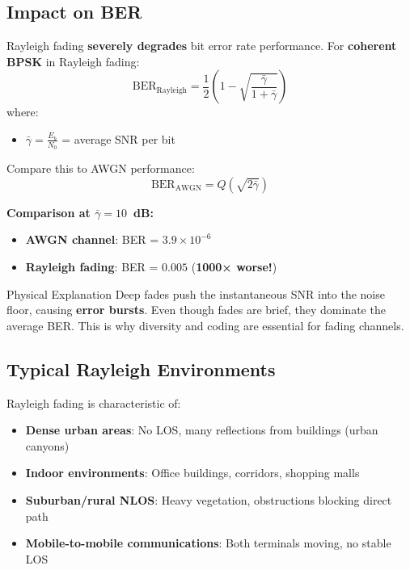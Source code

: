 \subsection{Impact on BER}

Rayleigh fading \textbf{severely degrades} bit error rate performance. For \textbf{coherent BPSK} in Rayleigh fading:
\begin{equation}
\text{BER}_{\text{Rayleigh}} = \frac{1}{2}\left(1 - \sqrt{\frac{\bar{\gamma}}{1 + \bar{\gamma}}}\right)
\end{equation}
where:
\begin{itemize}
\item $\bar{\gamma} = \frac{E_b}{N_0}$ = average SNR per bit
\end{itemize}

Compare this to AWGN performance:
\begin{equation}
\text{BER}_{\text{AWGN}} = Q\left(\sqrt{2\bar{\gamma}}\right)
\end{equation}

\textbf{Comparison at $\bar{\gamma} = 10$~dB:}
\begin{itemize}
\item \textbf{AWGN channel}: BER = $3.9 \times 10^{-6}$
\item \textbf{Rayleigh fading}: BER = $0.005$ (\textbf{1000× worse!})
\end{itemize}

\begin{calloutbox}{Physical Explanation}
Deep fades push the instantaneous SNR into the noise floor, causing \textbf{error bursts}. Even though fades are brief, they dominate the average BER. This is why diversity and coding are essential for fading channels.
\end{calloutbox}

\subsection{Typical Rayleigh Environments}

Rayleigh fading is characteristic of:
\begin{itemize}
\item \textbf{Dense urban areas}: No LOS, many reflections from buildings (urban canyons)
\item \textbf{Indoor environments}: Office buildings, corridors, shopping malls
\item \textbf{Suburban/rural NLOS}: Heavy vegetation, obstructions blocking direct path
\item \textbf{Mobile-to-mobile communications}: Both terminals moving, no stable LOS
\end{itemize}

